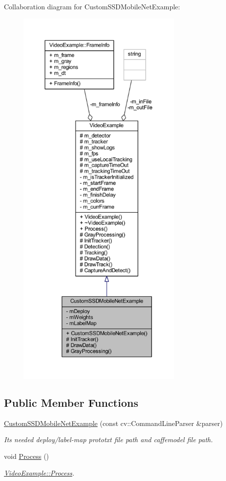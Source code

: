 Collaboration diagram for Custom\+S\+S\+D\+Mobile\+Net\+Example\+:\nopagebreak
\begin{figure}[H]
\begin{center}
\leavevmode
\includegraphics[height=550pt]{class_custom_s_s_d_mobile_net_example__coll__graph}
\end{center}
\end{figure}
\subsection*{Public Member Functions}
\begin{DoxyCompactItemize}
\item 
\mbox{\hyperlink{class_custom_s_s_d_mobile_net_example_a9e343f571db038199f28b6d1ed04eba5}{Custom\+S\+S\+D\+Mobile\+Net\+Example}} (const cv\+::\+Command\+Line\+Parser \&parser)
\begin{DoxyCompactList}\small\item\em It\textquotesingle{}s needed deploy/label-\/map prototxt file path and caffemodel file path. \end{DoxyCompactList}\item 
void \mbox{\hyperlink{class_video_example_a87efc66a82c36ad3380623d30a12abf2}{Process}} ()
\begin{DoxyCompactList}\small\item\em \mbox{\hyperlink{class_video_example_a87efc66a82c36ad3380623d30a12abf2}{Video\+Example\+::\+Process}}. \end{DoxyCompactList}\end{DoxyCompactItemize}
